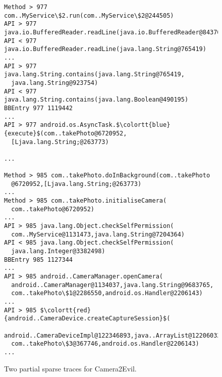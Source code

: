
  






\begin{figure}
  \footnotesize
\begin{Verbatim}[commandchars=\\\{\},codes={\catcode`$=3\catcode`^=7\catcode`_=8}]
Method > 977 com..MyService\$2.run(com..MyService\$2@244505)
API > 977 java.io.BufferedReader.readLine(java.io.BufferedReader@84370)
API < 977 java.io.BufferedReader.readLine(java.lang.String@765419)
...
API > 977 java.lang.String.contains(java.lang.String@765419,
  java.lang.String@923754)
API < 977 java.lang.String.contains(java.lang.Boolean@490195)
BBEntry 977 1119442
...
API > 977 android.os.AsyncTask.$\colortt{blue}{execute}$(com..takePhoto@6720952,
  [Ljava.lang.String;@263773)

...

Method > 985 com..takePhoto.doInBackground(com..takePhoto
  @6720952,[Ljava.lang.String;@263773)
...
Method > 985 com..takePhoto.initialiseCamera(
  com..takePhoto@6720952)
...
API > 985 java.lang.Object.checkSelfPermission(
  com..MyService@1131473,java.lang.String@7204364)
API < 985 java.lang.Object.checkSelfPermission(
  java.lang.Integer@3382498)
BBEntry 985 1127344
...
API > 985 android..CameraManager.openCamera(
  android..CameraManager@1134037,java.lang.String@9683765,  
  com..takePhoto\$1@2286550,android.os.Handler@2206143)
...
API > 985 $\colortt{red}{android..CameraDevice.createCaptureSession}$(
  android..CameraDeviceImpl@122346893,java..ArrayList@122060324,
  com..takePhoto\$3@367746,android.os.Handler@2206143)
...
\end{Verbatim}
  \caption{Two partial sparse traces for Camera2Evil.}
  \label{fig:example-trace}
\end{figure}
%

